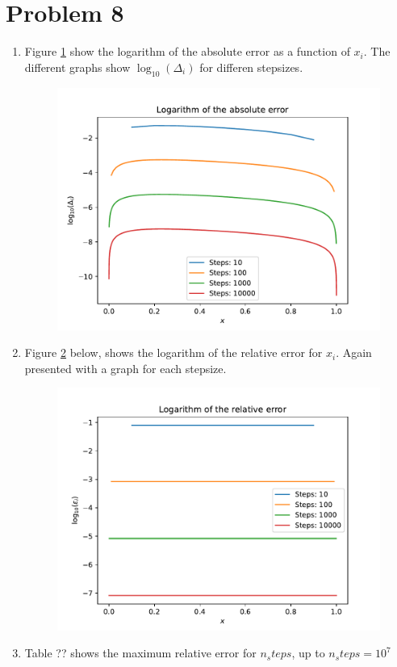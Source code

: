 \documentclass[english,notitlepage]{revtex4-1}  %
\begin{document}
\section*{Problem 8}
\begin{enumerate}[label= \alph*)]
  \item Figure \ref{fig:abs_error} show the logarithm of the absolute error as a function of $x_i$. The different graphs show $\log_{10}(\Delta_i)$ for differen stepsizes.
  \begin{figure}[H]
      \centering
      \includegraphics[width=.7\textwidth]{../figures/abs_error.pdf}
      \caption{}
      \label{fig:abs_error}
  \end{figure}
  \item Figure \ref{fig:rel_error} below, shows the logarithm of the relative error for $x_i$. Again presented with a graph for each stepsize.
  \begin{figure}[H]
    \centering
    \includegraphics[width=.7\textwidth]{../figures/rel_error.pdf}
    \caption{}
    \label{fig:rel_error}
  \end{figure}
  \item Table ?? shows the maximum relative error for $n_steps$, up to $n_steps = 10^7$


\end{enumerate}
\end{document}
